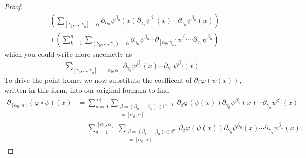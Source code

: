 \documentclass[12pt]{amsart}
\begin{document}
\begin{proof}
\begin{align*}
&   \left( \sum_{ [\gamma_1,\dots,\gamma_n] = \alpha}
   \partial_{\alpha_0}\psi^{\beta_0}(x) \partial_{\gamma_1} \psi^{\beta_1}(x) \cdots \partial_{\gamma_n}\psi^{\beta_n}(x) \right) \\
& +
 \left( \sum_{k=1}^{n} \sum_{ (\gamma_0, \dots,\gamma_n) = \alpha}
  \partial_{\gamma_0}\psi^{\beta_0} \cdots \partial_{[\alpha_0,\gamma_k]} \psi^{\beta_k} \cdots \partial_{\gamma_n} \psi^{\beta_n}\right)
\end{align*}
which you could write more succinctly as
\begin{align*}
  \sum_{[\gamma_0,\dots,\gamma_n] = [\alpha_0,\alpha]}
  \partial_{\gamma_0}\psi^{\beta_0}(x)
  \cdots
  \partial_{\gamma_n}\psi^{\beta_n}(x)
\end{align*}
To drive the point home, we now substitute the coefficent of
$\partial_{\beta} \varphi(\psi(x))$, written in this form,
into our original formula to find
\begin{align*}
  \partial_{[\alpha_0,\alpha]}( \varphi \circ \psi)(x) &= \sum_{n=0}^{|\alpha |} \sum_{
    \substack{
      \beta = (\beta_0,\dots,\beta_n) \in \mathbb{I}^{n+1}\\
      [\gamma_0,\dots,\gamma_n] = [\alpha_0,\alpha]      
      }
    }\partial_{\beta}\varphi(\psi(x)) \partial_{\gamma_0}\psi^{\beta_0}(x) \cdots \partial_{\gamma_n}\psi^{\beta_n}(x) \\
  &=\sum_{n=1}^{|[\alpha_0,\alpha] |} \sum_{
    \substack{
      \beta = (\beta_1,\dots,\beta_n) \in \mathbb{I}^{n}\\
      [\gamma_1,\dots,\gamma_n] = [\alpha_0,\alpha]      
      }
    }\partial_{\beta}\varphi(\psi(x)) \partial_{\gamma_0}\psi^{\beta_0}(x) \cdots \partial_{\gamma_n}\psi^{\beta_n}(x).
\end{align*}

\end{proof}



\end{document}
